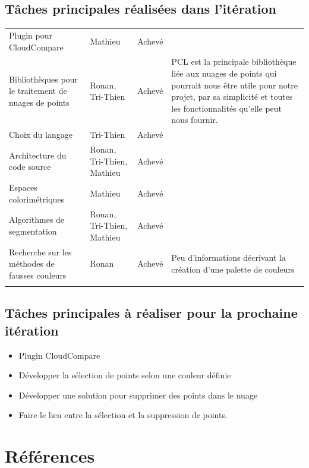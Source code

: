 \documentclass[12pt,titlepage,french]{article}
\begin{document}
\subsection{Tâches principales réalisées dans l'itération}
\noindent\begin{tabu} to \toprule
  &&&\\\toprule
Plugin pour CloudCompare
& Mathieu
& Achevé
& \\\midrule
Bibliothèques pour le traitement de nuages de points
& Ronan, Tri-Thien
& Achevé
& PCL est la principale bibliothèque liée aux nuages de points qui pourrait nous être utile pour notre projet, par sa simplicité et toutes les fonctionnalités qu'elle peut nous fournir.\\\midrule
Choix du langage
& Tri-Thien
& Achevé
& \\\midrule
Architecture du code source
& Ronan, Tri-Thien, Mathieu
& Achevé
& \\\midrule
Espaces colorimétriques
& Mathieu
& Achevé
& \\\midrule
Algorithmes de segmentation
& Ronan, Tri-Thien, Mathieu
& Achevé
& \\\midrule
Recherche sur les méthodes de fausses couleurs
& Ronan
& Achevé
& Peu d'informations décrivant la création d'une palette de couleurs\\\bottomrule  \\
\end{tabu}

\subsection{Tâches principales à réaliser pour la prochaine itération}
\begin{itemize}
  \item Plugin CloudCompare
  \item Développer la sélection de points selon une couleur définie
  \item Développer une solution pour supprimer des points dans le nuage
  \item Faire le lien entre la sélection et la suppression de points.
\end{itemize}

\newpage

\section {Références}
\end{document}
